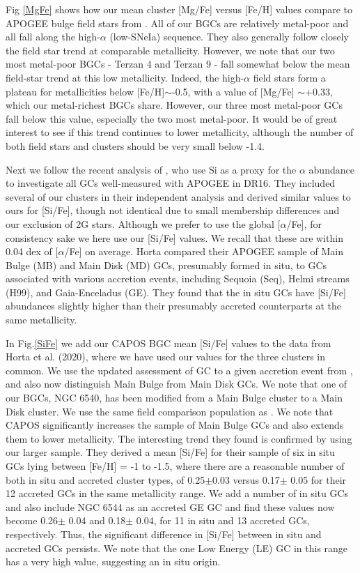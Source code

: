 \documentclass[onecolumn]{aa}
\begin{document}
Fig \ref{MgFe} shows how our mean cluster  [Mg/Fe] versus [Fe/H] values compare to APOGEE bulge field stars from \citet{Rojas-Arriagada2020}. All of our BGCs are relatively metal-poor and all fall along the high-$\alpha$ (low-SNeIa) sequence. They also generally follow closely the field star trend at comparable metallicity. However, we note that our two most metal-poor BGCs - Terzan 4 and Terzan 9 - fall somewhat below the mean field-star trend at this low metallicity. Indeed, the high-$\alpha$ field stars form a plateau for metallicities below [Fe/H]$\sim$-0.5, with a value of [Mg/Fe] $\sim$+0.33, which our metal-richest BGCs share. However, our three most metal-poor GCs fall below this value, especially the two most metal-poor. It would be of great interest to see if this trend continues to lower metallicity, although the number of both field stars and clusters should be very small
below -1.4.

Next we follow the recent analysis of \citet{Horta2020}, who use Si as a proxy for the $\alpha$ abundance to investigate all GCs well-measured with APOGEE in DR16. They included several of our clusters in their independent analysis and derived similar values to ours for [Si/Fe], though not identical due to small membership differences and our exclusion of 2G stars. Although we prefer to use the global [$\alpha$/Fe], for consistency sake we here use our [Si/Fe] values. We recall that these are within 0.04 dex of [$\alpha$/Fe] on average. 
Horta compared their APOGEE sample of Main Bulge (MB) and Main Disk (MD) GCs, presumably formed in situ, to GCs associated with various accretion events, including Sequoia (Seq), Helmi streams (H99), and Gaia-Enceladus (GE).  They found that the in situ GCs have [Si/Fe] abundances slightly higher than their presumably accreted counterparts at the same metallicity.

In Fig.\ref{SiFe} we add our CAPOS BGC mean [Si/Fe] values to the data from Horta et al. (2020), where we have used our values for the three clusters in common. We use the updated assessment of GC to a given accretion event from \cite{Bajkova2020}, and also now distinguish Main Bulge from Main Disk GCs. We note that one of our BGCs, NGC 6540, has been modified from a Main Bulge cluster \citep{Massari2019} to a Main Disk cluster.
We use the same field comparison population as \cite{Horta2020}.
We note that CAPOS significantly increases the sample of Main Bulge GCs and also extends them to lower metallicity.
The interesting trend they found is confirmed by using our larger sample.  They derived a mean [Si/Fe] for their sample of six in situ GCs lying between [Fe/H] = -1 to -1.5, where there are a reasonable number of both in situ and accreted cluster types, of 0.25$\pm$0.03 versus 
0.17$\pm$ 0.05 for their 12 accreted GCs in the same metallicity range. We add a number of in situ GCs and also include NGC 6544 as an accreted GE GC \citep{Bajkova2020} and find these values now become 
0.26$\pm$ 0.04 and 0.18$\pm$ 0.04, for 11 in situ and 13 accreted GCs, respectively.
Thus, the significant difference in [Si/Fe] between in situ and accreted GCs persists.
We note that the one Low Energy (LE) GC in this range has a very high value, suggesting an in situ origin.
\end{document}
